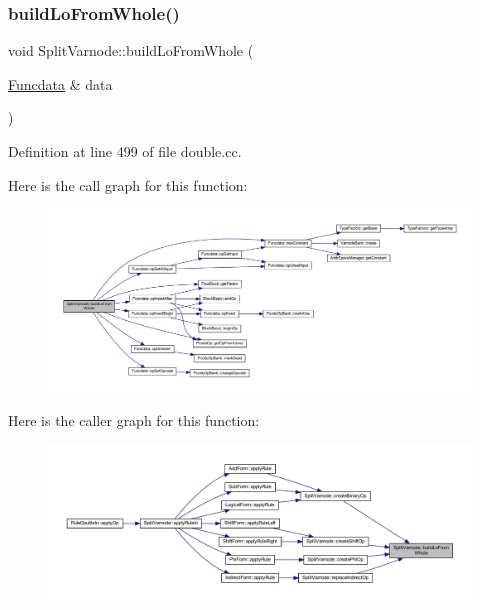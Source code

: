 \subsubsection{\texorpdfstring{buildLoFromWhole()}{buildLoFromWhole()}}
{\footnotesize\ttfamily void Split\+Varnode\+::build\+Lo\+From\+Whole (\begin{DoxyParamCaption}\item[{\mbox{\hyperlink{class_funcdata}{Funcdata}} \&}]{data }\end{DoxyParamCaption})}



Definition at line 499 of file double.\+cc.

Here is the call graph for this function\+:
\nopagebreak
\begin{figure}[H]
\begin{center}
\leavevmode
\includegraphics[width=350pt]{class_split_varnode_ae9cef4fbd2931fb270988180eab642ad_cgraph}
\end{center}
\end{figure}
Here is the caller graph for this function\+:
\nopagebreak
\begin{figure}[H]
\begin{center}
\leavevmode
\includegraphics[width=350pt]{class_split_varnode_ae9cef4fbd2931fb270988180eab642ad_icgraph}
\end{center}
\end{figure}
\mbox{\label{class_split_varnode_a20df0a8fa4eba1c02fd24ae129272d71}} 
